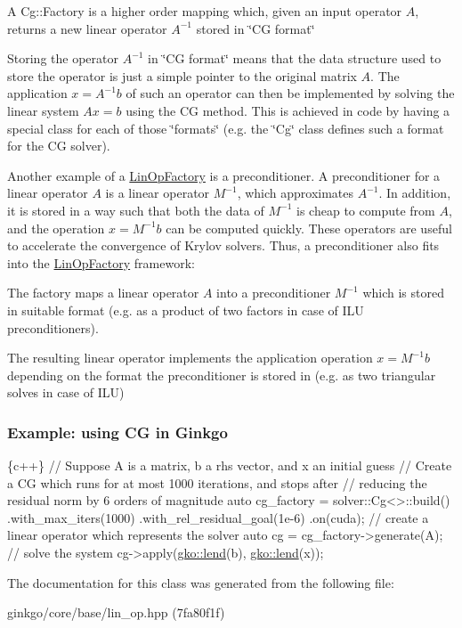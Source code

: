 \begin{DoxyItemize}
\item A Cg\+::\+Factory is a higher order mapping which, given an input operator $A$, returns a new linear operator $A^{-1}$ stored in \char`\"{}\+C\+G
    format\char`\"{}
\item Storing the operator $A^{-1}$ in \char`\"{}\+C\+G format\char`\"{} means that the data structure used to store the operator is just a simple pointer to the original matrix $A$. The application $x = A^{-1}b$ of such an operator can then be implemented by solving the linear system $Ax = b$ using the CG method. This is achieved in code by having a special class for each of those \char`\"{}formats\char`\"{} (e.\+g. the \char`\"{}\+Cg\char`\"{} class defines such a format for the CG solver).
\end{DoxyItemize}

Another example of a \hyperlink{classgko_1_1LinOpFactory}{Lin\+Op\+Factory} is a preconditioner. A preconditioner for a linear operator $A$ is a linear operator $M^{-1}$, which approximates $A^{-1}$. In addition, it is stored in a way such that both the data of $M^{-1}$ is cheap to compute from $A$, and the operation $x = M^{-1}b$ can be computed quickly. These operators are useful to accelerate the convergence of Krylov solvers. Thus, a preconditioner also fits into the \hyperlink{classgko_1_1LinOpFactory}{Lin\+Op\+Factory} framework\+:


\begin{DoxyItemize}
\item The factory maps a linear operator $A$ into a preconditioner $M^{-1}$ which is stored in suitable format (e.\+g. as a product of two factors in case of I\+LU preconditioners).
\item The resulting linear operator implements the application operation $x = M^{-1}b$ depending on the format the preconditioner is stored in (e.\+g. as two triangular solves in case of I\+LU)
\end{DoxyItemize}

\subsubsection*{Example\+: using CG in Ginkgo }


\begin{DoxyCode}
\{c++\}
\textcolor{comment}{// Suppose A is a matrix, b a rhs vector, and x an initial guess}
\textcolor{comment}{// Create a CG which runs for at most 1000 iterations, and stops after}
\textcolor{comment}{// reducing the residual norm by 6 orders of magnitude}
\textcolor{keyword}{auto} cg\_factory = solver::Cg<>::build()
    .with\_max\_iters(1000)
    .with\_rel\_residual\_goal(1e-6)
    .on(cuda);
\textcolor{comment}{// create a linear operator which represents the solver}
\textcolor{keyword}{auto} cg = cg\_factory->generate(A);
\textcolor{comment}{// solve the system}
cg->apply(\hyperlink{namespacegko_aa8cb4876b72e5e1036ea9575443c439b}{gko::lend}(b), \hyperlink{namespacegko_aa8cb4876b72e5e1036ea9575443c439b}{gko::lend}(x));
\end{DoxyCode}
 

The documentation for this class was generated from the following file\+:\begin{DoxyCompactItemize}
\item 
ginkgo/core/base/lin\+\_\+op.\+hpp (7fa80f1f)\end{DoxyCompactItemize}
